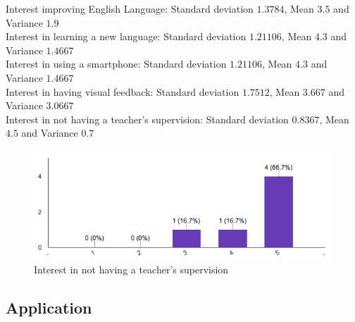 \noindent Interest improving English Language: Standard deviation $1.3784$, Mean $3.5$ and Variance $1.9$ \\
\noindent Interest in learning a new language: Standard deviation $1.21106$, Mean $4.3$ and Variance $1.4667$ \\
\noindent Interest in using a smartphone: Standard deviation $1.21106$, Mean $4.3$ and Variance $1.4667$ \\
\noindent Interest in having visual feedback: Standard deviation $1.7512$, Mean $3.667$ and Variance $3.0667$ \\
\noindent Interest in not having a teacher's supervision: Standard deviation $0.8367$, Mean $4.5$ and Variance $0.7$

\begin{figure}[!ht]
	\centering
	\includegraphics[scale=0.5]{Figures/responses/interest_no_teacher.png}
	\caption{Interest in not having a teacher's supervision}
	\label{fig:int_no_teacher}
\end{figure}

\subsection*{Application}
\label{sub:Application}

